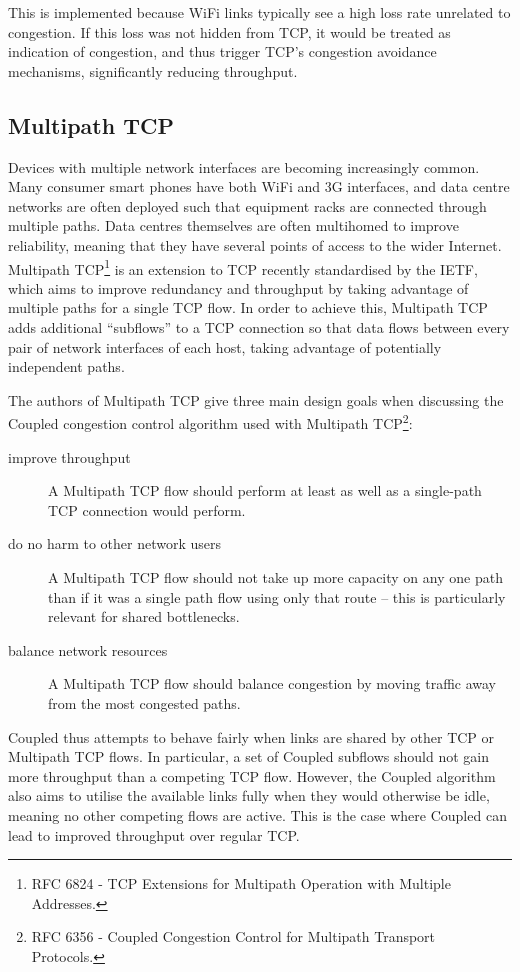 This is implemented because WiFi links typically see a high loss rate unrelated
to congestion. If this loss was not hidden from TCP, it would be treated
as indication of congestion, and thus trigger TCP's congestion avoidance
mechanisms, significantly reducing throughput.

\subsection{Multipath TCP}
\label{sec:bg:mptcp}
Devices with multiple network interfaces are becoming increasingly common. Many consumer
smart phones have both WiFi and 3G interfaces, and data centre networks are
often deployed such that equipment racks are connected through multiple paths.
Data centres themselves are often multihomed to improve reliability, meaning
that they have several points of access to the wider Internet. Multipath
TCP\footnote{RFC 6824 - TCP Extensions for Multipath Operation with Multiple
Addresses.} is an extension to TCP recently standardised by the IETF, which aims
to improve redundancy and throughput by taking advantage of multiple paths for a
single TCP flow. In order to achieve this, Multipath TCP adds additional
``subflows'' to a TCP connection so that data flows between every pair of
network interfaces of each host, taking advantage of potentially independent
paths.

The authors of Multipath TCP give three main design goals when discussing the
Coupled congestion control algorithm used with Multipath TCP\footnote{RFC 6356 - Coupled Congestion Control for
Multipath Transport Protocols.}:

\begin{description}
  \item[improve throughput] A Multipath TCP flow should perform at least as well
    as a single-path TCP connection would perform.
  \item[do no harm to other network users] A Multipath TCP flow should not take
    up more capacity on any one path than if it was a single path flow using
    only that route -- this is particularly relevant for shared bottlenecks.
  \item[balance network resources] A Multipath TCP flow should balance congestion by moving
    traffic away from the most congested paths.
\end{description}

Coupled thus attempts to behave fairly when links are shared by other TCP or
Multipath TCP flows. In particular, a set of Coupled subflows should not gain
more throughput than a competing TCP flow. However, the Coupled algorithm also
aims to utilise the available
links fully when they would otherwise be idle, meaning no other competing flows
are active. This is the case where Coupled can lead to improved throughput over
regular TCP.

